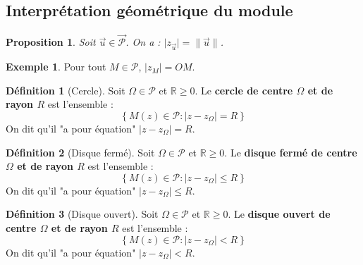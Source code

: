 \documentclass[french]{book}
\newcommand{\R}{\mathbb{R}}
\theoremstyle{plain}
\newtheorem{prop}{Proposition}[chapter]
\theoremstyle{definition}
\newtheorem{dfn}{Définition}[chapter]
\newtheorem{exa}{Exemple}[chapter]
\theoremstyle{remark}
\begin{document}
\subsection{Interprétation géométrique du module}
\begin{prop}
	Soit $\overrightarrow{u}\in\overrightarrow{\mathcal{P}}$. On a : $\lvert z_{\overrightarrow{u}}\rvert =\lVert\overrightarrow{u}\rVert$.
\end{prop}
\begin{exa}
	Pour tout $M\in\mathcal{P}$, $\lvert z_M\rvert=OM$.
\end{exa}
\begin{dfn}[Cercle]
	Soit $\Omega\in\mathcal{P}$ et $\R\geqslant0$. Le \textbf{cercle de centre $\Omega$ et de rayon $R$} est l'ensemble : $$\left\{M(z)\in\mathcal{P}: \lvert z-z_{\Omega}\rvert =R\right\}$$ On dit qu'il "a pour équation" $\lvert z-z_{\Omega}\rvert=R$.
\end{dfn}
\begin{dfn}[Disque fermé]
	Soit $\Omega\in\mathcal{P}$ et $\R\geqslant0$. Le \textbf{disque fermé de centre $\Omega$ et de rayon $R$} est l'ensemble : $$\left\{M(z)\in\mathcal{P}: \lvert z-z_{\Omega}\rvert \leqslant R\right\}$$ On dit qu'il "a pour équation" $\lvert z-z_{\Omega}\rvert\leqslant R$.
\end{dfn}
\begin{dfn}[Disque ouvert]
	Soit $\Omega\in\mathcal{P}$ et $\R\geqslant0$. Le \textbf{disque ouvert de centre $\Omega$ et de rayon $R$} est l'ensemble : $$\left\{M(z)\in\mathcal{P}: \lvert z-z_{\Omega}\rvert <R\right\}$$ On dit qu'il "a pour équation" $\lvert z-z_{\Omega}\rvert<R$.
\end{dfn}
\end{document}
